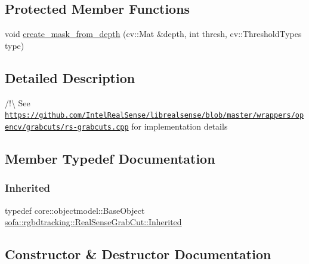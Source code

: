 \subsection*{Protected Member Functions}
\begin{DoxyCompactItemize}
\item 
void \hyperlink{classsofa_1_1rgbdtracking_1_1_real_sense_grab_cut_abfa9d9858f8cf1ab78e9e908709383ec}{create\+\_\+mask\+\_\+from\+\_\+depth} (cv\+::\+Mat \&depth, int thresh, cv\+::\+Threshold\+Types type)
\end{DoxyCompactItemize}


\subsection{Detailed Description}
/!\textbackslash{} See \href{https://github.com/IntelRealSense/librealsense/blob/master/wrappers/opencv/grabcuts/rs-grabcuts.cpp}{\tt https\+://github.\+com/\+Intel\+Real\+Sense/librealsense/blob/master/wrappers/opencv/grabcuts/rs-\/grabcuts.\+cpp} for implementation details 

\subsection{Member Typedef Documentation}
\mbox{\label{classsofa_1_1rgbdtracking_1_1_real_sense_grab_cut_a3d3643071d86257ce05bd3e86a603763}} 
\subsubsection{\texorpdfstring{Inherited}{Inherited}}
{\footnotesize\ttfamily typedef core\+::objectmodel\+::\+Base\+Object \hyperlink{classsofa_1_1rgbdtracking_1_1_real_sense_grab_cut_a3d3643071d86257ce05bd3e86a603763}{sofa\+::rgbdtracking\+::\+Real\+Sense\+Grab\+Cut\+::\+Inherited}}



\subsection{Constructor \& Destructor Documentation}
\mbox{\label{classsofa_1_1rgbdtracking_1_1_real_sense_grab_cut_ac99b63b2f756c9ac8073032d78ef334e}} 
